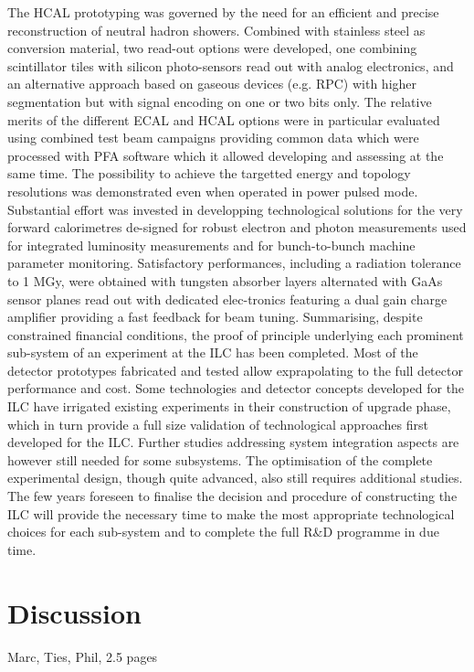\documentclass[%
 reprint,
 amsmath,amssymb,
 aps,
]{revtex4-1}
\begin{document}
The HCAL prototyping was governed by the need for an eﬃcient and precise reconstruction of neutral hadron showers. Combined with stainless steel as conversion material, two read-out options were developed, one combining scintillator tiles with silicon photo-sensors read out with analog electronics, and an alternative approach based on gaseous devices (e.g. RPC) with higher segmentation but with signal encoding on one or two bits only.
The relative merits of the diﬀerent ECAL and HCAL options were in particular evaluated using combined test beam campaigns providing common data which were processed with PFA software which it allowed developing and assessing at the same time. The possibility to achieve the targetted energy and topology resolutions was demonstrated even when operated in power pulsed mode.
Substantial eﬀort was invested in developping technological solutions for the very forward calorimetres de-signed for robust electron and photon measurements used for integrated luminosity measurements and for bunch-to-bunch machine parameter monitoring. Satisfactory performances, including a radiation tolerance to 1 MGy, were obtained with tungsten absorber layers alternated with GaAs sensor planes read out with dedicated elec-tronics featuring a dual gain charge ampliﬁer providing a fast feedback for beam tuning.
Summarising, despite constrained ﬁnancial conditions, the proof of principle underlying each prominent sub-system of an experiment at the ILC has been completed. Most of the detector prototypes fabricated and tested allow exprapolating to the full detector performance and cost. Some technologies and detector concepts developed for the ILC have irrigated existing experiments in their construction of upgrade phase, which in turn provide a full size validation of technological approaches ﬁrst developed for the ILC. Further studies addressing system integration aspects are however still needed for some subsystems. The optimisation of the complete experimental design, though quite advanced, also still requires additional studies. The few years foreseen to ﬁnalise the decision and procedure of constructing the ILC will provide the necessary time to make the most appropriate technological choices for each sub-system and to complete the full R&D programme in due time.

\section{\label{sec:discussion}Discussion}

Marc, Ties, Phil, 2.5 pages
\end{document}
